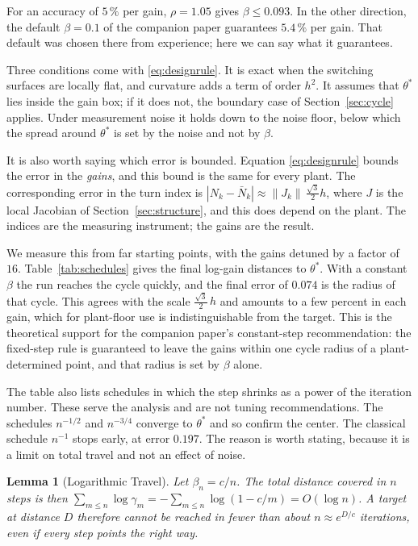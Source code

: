 \documentclass[letterpaper, 10pt, conference, twocolumn]{ieeeconf}
\newtheorem{lemma}{Lemma}
\newcommand{\Nbar}{\bar{N}}
\begin{document}
For an accuracy of $5\,\%$ per gain, $\rho = 1.05$ gives $\beta \le 0.093$. In
the other direction, the default $\beta = 0.1$ of the companion paper
guarantees $5.4\,\%$ per gain. That default was chosen there from experience;
here we can say what it guarantees.

Three conditions come with \eqref{eq:designrule}. It is exact when the
switching surfaces are locally flat, and curvature adds a term of order $h^2$.
It assumes that $\theta^*$ lies inside the gain box; if it does not, the
boundary case of Section~\ref{sec:cycle} applies. Under measurement noise it
holds down to the noise floor, below which the spread around $\theta^*$ is set
by the noise and not by $\beta$.

It is also worth saying which error is bounded. Equation
\eqref{eq:designrule} bounds the error in the \emph{gains}, and this bound is
the same for every plant. The corresponding error in the turn index is
$|N_k - \Nbar_k| \approx \|J_k\| \, \tfrac{\sqrt{3}}{2} h$, where $J$ is the
local Jacobian of Section~\ref{sec:structure}, and this does depend on the
plant. The indices are the measuring instrument; the gains are the result.

We measure this from far starting points, with the gains detuned by a factor
of $16$. Table~\ref{tab:schedules} gives the final log-gain distances to
$\theta^*$. With a constant $\beta$ the run reaches the cycle quickly, and the
final error of $0.074$ is the radius of that cycle. This agrees with the scale
$\tfrac{\sqrt{3}}{2}\, h$ and amounts to a few percent in each gain, which for
plant-floor use is indistinguishable from the target. This is the theoretical
support for the companion paper's constant-step recommendation: the fixed-step
rule is guaranteed to leave the gains within one cycle radius of a
plant-determined point, and that radius is set by $\beta$ alone.

The table also lists schedules in which the step shrinks as a power of the
iteration number. These serve the analysis and are not tuning recommendations.
The schedules $n^{-1/2}$ and $n^{-3/4}$ converge to $\theta^*$ and so confirm
the center. The classical schedule $n^{-1}$ stops early, at error $0.197$. The
reason is worth stating, because it is a limit on total travel and not an
effect of noise.

\begin{lemma}[Logarithmic Travel]
\label{lem:travel}
Let $\beta_n = c/n$. The total distance covered in $n$ steps is then
$\sum_{m \le n} \log\gamma_m = -\sum_{m \le n}\log(1 - c/m) = O(\log n)$.
A target at distance $D$ therefore cannot be reached in fewer than about
$n \approx e^{D/c}$ iterations, even if every step points the right way.
\end{lemma}
\end{document}
